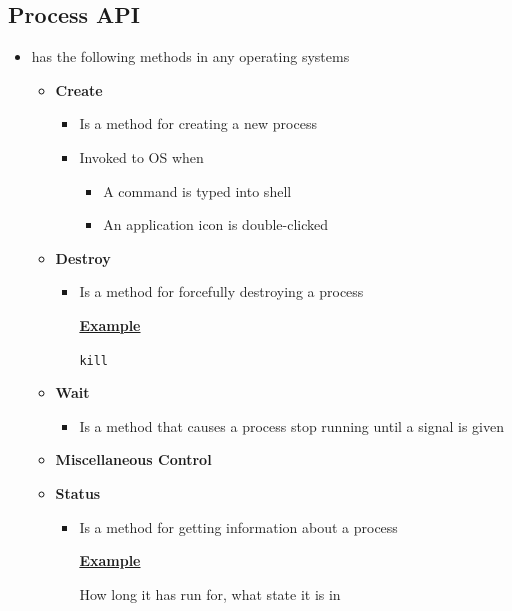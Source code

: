 \documentclass[12pt]{article}
\begin{document}
\subsection{Process API}
\begin{itemize}
    \item has the following methods in any operating systems
    \begin{itemize}
        \item \textbf{Create}
        \begin{itemize}
            \item Is a method for creating a new process
            \item Invoked to OS when
            \begin{itemize}
                \item A command is typed into shell
                \item An application icon is double-clicked
            \end{itemize}
        \end{itemize}
        \item \textbf{Destroy}
        \begin{itemize}
            \item Is a method for forcefully destroying a process

            \bigskip

            \underline{\textbf{Example}}

            \bigskip

            \texttt{kill}
        \end{itemize}
        \item \textbf{Wait}
        \begin{itemize}
            \item Is a method that causes a process stop running until a
            signal is given
        \end{itemize}
        \item \textbf{Miscellaneous Control}
        \item \textbf{Status}
        \begin{itemize}
            \item Is a method for getting information about a process

            \bigskip

            \underline{\textbf{Example}}

            \bigskip

            How long it has run for, what state it is in
        \end{itemize}
    \end{itemize}
\end{itemize}
\end{document}
